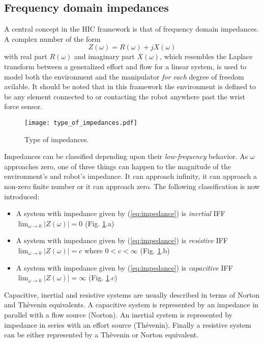 \subsection{Frequency domain impedances}
A central concept in the HIC framework is that of frequency domain impedances.
A complex number of the form 
\begin{equation}
  \label{eq:impedance}
  Z(\omega)=R(\omega)+jX(\omega)
\end{equation}
with real part $R(\omega)$ and imaginary part $X(\omega)$, which resembles the Laplace
transform between a generalized effort and flow for a linear system, is used to model
both the environment and the manipulator \emph{for each} degree of freedom
avilable. It should be noted that in this framework
the environment is defined to be any element connected to or
contacting the robot anywhere past the wrist force sensor.
\begin{figure}[h]
  \centering
  \texttt{[image: type\_of\_impedances.pdf]}
  \caption{Type of impedances. \label{fig:type_of_impedances}}
\end{figure}
\par
Impedances can be classified depending upon their \emph{low-frequency} behavior.
As $\omega$ approaches zero, one of three things can happen to 
the magnitude of the environment's and robot's impedance. It can 
approach infinity, it can approach a non-zero finite number or it can approach zero.
The following classification is now introduced:
\begin{itemize}
\item A system with impedance given by  (\ref{eq:impedance}) is \emph{inertial} IFF $\lim_{\omega \to 0}|Z(\omega)| = 0$ (Fig. \ref{fig:type_of_impedances}.a)
\item A system with impedance given by  (\ref{eq:impedance}) is \emph{resistive} IFF $\lim_{\omega \to 0}|Z(\omega)| = c$ where $0<c<\infty$ (Fig. \ref{fig:type_of_impedances}.b)
\item A system with impedance given by  (\ref{eq:impedance}) is \emph{capacitive} IFF $\lim_{\omega \to 0}|Z(\omega)| = \infty$ (Fig. \ref{fig:type_of_impedances}.c)
\end{itemize}

Capacitive, inertial and resistive systems are usually described in terms of 
Norton and Thèvenin equivalents. A capacitive system is 
represented by an impedance in parallel with a flow source (Norton).
An inertial system is represented by impedance in series with an 
effort source (Thévenin). Finally a resistive system 
can be either represented by a Thèvenin or Norton equivalent.

